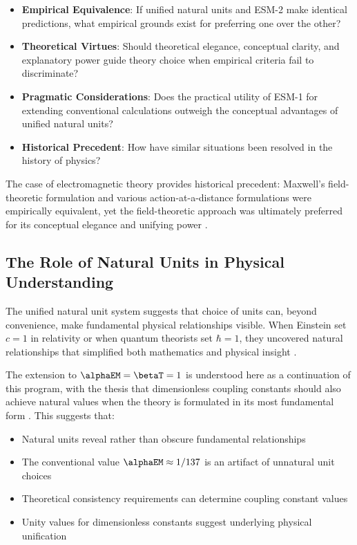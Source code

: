 	\begin{itemize}
		\item \textbf{Empirical Equivalence}: If unified natural units and ESM-2 make identical predictions, what empirical grounds exist for preferring one over the other?
		\item \textbf{Theoretical Virtues}: Should theoretical elegance, conceptual clarity, and explanatory power guide theory choice when empirical criteria fail to discriminate? \cite{Kuhn1977}
		\item \textbf{Pragmatic Considerations}: Does the practical utility of ESM-1 for extending conventional calculations outweigh the conceptual advantages of unified natural units?
		\item \textbf{Historical Precedent}: How have similar situations been resolved in the history of physics? \cite{Poincare1905}
	\end{itemize}
	
	The case of electromagnetic theory provides historical precedent: Maxwell's field-theoretic formulation and various action-at-a-distance formulations were empirically equivalent, yet the field-theoretic approach was ultimately preferred for its conceptual elegance and unifying power \cite{Maxwell1873}.
	
	\subsection{The Role of Natural Units in Physical Understanding}
	\label{subsec:natural_units_understanding}
	
	The unified natural unit system suggests that choice of units can, beyond convenience, make fundamental physical relationships visible. When Einstein set $c = 1$ in relativity or when quantum theorists set $\hbar = 1$, they uncovered natural relationships that simplified both mathematics and physical insight \cite{Einstein1905,Dirac1927}.
	
	The extension to $\alphaEM = \betaT = 1$ is understood here as a continuation of this program, with the thesis that dimensionless coupling constants should also achieve natural values when the theory is formulated in its most fundamental form \cite{pascher_unified_2025}. This suggests that:
	
	\begin{itemize}
		\item Natural units reveal rather than obscure fundamental relationships
		\item The conventional value $\alphaEM \approx 1/137$ is an artifact of unnatural unit choices
		\item Theoretical consistency requirements can determine coupling constant values
		\item Unity values for dimensionless constants suggest underlying physical unification
	\end{itemize}
	
